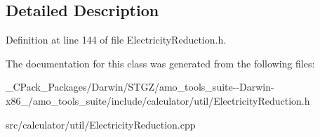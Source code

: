 \subsection{Detailed Description}


Definition at line 144 of file Electricity\+Reduction.\+h.



The documentation for this class was generated from the following files\+:\begin{DoxyCompactItemize}
\item 
\+\_\+\+C\+Pack\+\_\+\+Packages/\+Darwin/\+S\+T\+G\+Z/amo\+\_\+tools\+\_\+suite-\/-\/\+Darwin-\/x86\+\_/amo\+\_\+tools\+\_\+suite/include/calculator/util/Electricity\+Reduction.\+h\item 
src/calculator/util/Electricity\+Reduction.\+cpp\end{DoxyCompactItemize}
